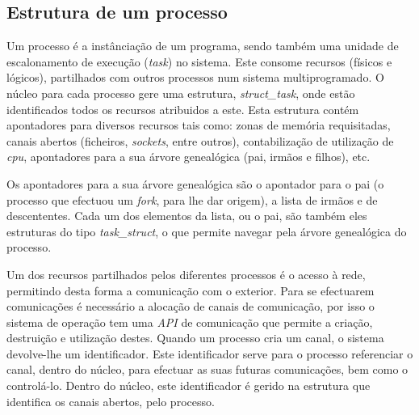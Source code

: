 



\subsection{Estrutura de um processo}

Um processo é a instânciação de um programa, sendo também uma unidade de escalonamento de execução (\textit{task}) no sistema.
Este consome recursos (físicos e lógicos), partilhados com outros processos num sistema multiprogramado.
O núcleo para cada processo gere uma estrutura, \textit{struct\_task}, onde estão identificados todos os recursos atribuidos a este.
Esta estrutura contém apontadores para diversos recursos tais como: zonas de memória requisitadas, canais abertos (ficheiros, \textit{sockets}, entre outros), contabilização de utilização de \textit{cpu}, apontadores para a sua árvore genealógica (pai, irmãos e filhos), etc.

Os apontadores para a sua árvore genealógica são o apontador para o pai (o processo que efectuou um \textit{fork}, para lhe dar origem), a lista de irmãos e de descententes.
Cada um dos elementos da lista, ou o pai, são também eles estruturas do tipo \textit{task\_struct}, o que permite navegar pela árvore genealógica do processo.

Um dos recursos partilhados pelos diferentes processos é o acesso à rede, permitindo desta forma a comunicação com o exterior.
Para se efectuarem comunicações é necessário a alocação de canais de comunicação, por isso o sistema de operação tem uma \textit{API} de comunicação que permite a criação, destruição e utilização destes.
Quando um processo cria um canal, o sistema devolve-lhe um identificador.
Este identificador serve para o processo referenciar o canal, dentro do núcleo, para efectuar as suas futuras comunicações, bem como o controlá-lo.
Dentro do núcleo, este identificador é gerido na estrutura que identifica os canais abertos, pelo processo.

